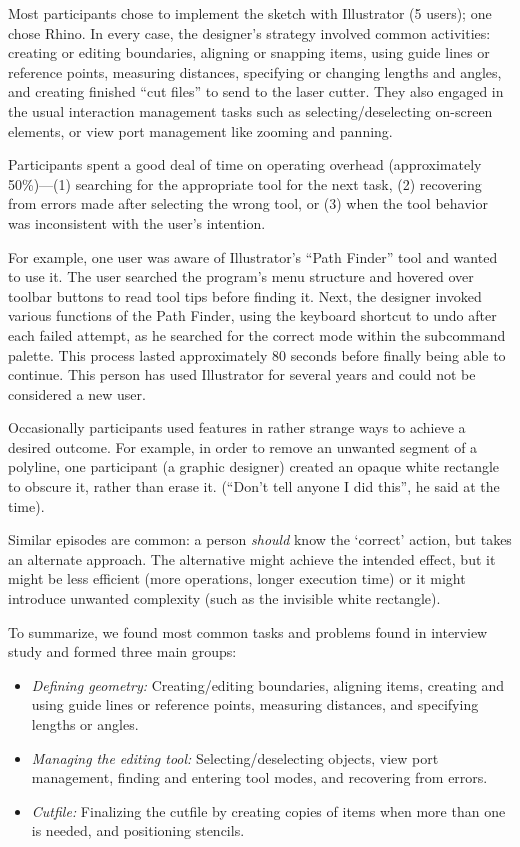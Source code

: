 \documentclass{article}
\begin{document}
Most participants chose to implement the sketch with Illustrator (5
users); one chose Rhino. In every case, the designer's strategy
involved common activities: creating or editing boundaries, aligning
or snapping items, using guide lines or reference points, measuring
distances, specifying or changing lengths and angles, and creating
finished ``cut files'' to send to the laser cutter.  They also engaged
in the usual interaction management tasks such as
selecting/deselecting on-screen elements, or view port management like
zooming and panning.

Participants spent a good deal of time on operating overhead
(approximately 50\%)---(1) searching for the appropriate tool for the
next task, (2) recovering from errors made after selecting the wrong
tool, or (3) when the tool behavior was inconsistent with the user's
intention.

For example, one user was aware of Illustrator's ``Path Finder'' tool
and wanted to use it. The user searched the program's menu structure
and hovered over toolbar buttons to read tool tips before finding
it. Next, the designer invoked various functions of the Path Finder,
using the keyboard shortcut to undo after each failed attempt, as he
searched for the correct mode within the subcommand palette. This
process lasted approximately 80 seconds before finally being able to
continue. This person has used Illustrator for several years and could
not be considered a new user.

Occasionally participants used features in rather strange ways to
achieve a desired outcome. For example, in order to remove an unwanted
segment of a polyline, one participant (a graphic designer) created an
opaque white rectangle to obscure it, rather than erase it. (``Don't
tell anyone I did this'', he said at the time).

Similar episodes are common: a person \textit{should} know the
`correct' action, but takes an alternate approach. The alternative
might achieve the intended effect, but it might be less efficient
(more operations, longer execution time) or it might introduce
unwanted complexity (such as the invisible white rectangle).

To summarize, we found most common tasks and problems found in
interview study and formed three main groups:

\begin{itemize}
\item \textit{Defining geometry:} Creating/editing boundaries,
  aligning items, creating and using guide lines or reference points,
  measuring distances, and specifying lengths or angles.
\item \textit{Managing the editing tool:} Selecting/deselecting
  objects, view port management, finding and entering tool modes, and
  recovering from errors.
\item \textit{Cutfile:} Finalizing the cutfile by creating copies of
  items when more than one is needed, and positioning stencils.
\end{itemize}
\end{document}
